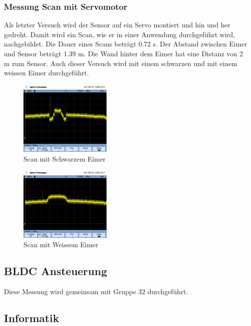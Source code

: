 \subsubsection{Messung Scan mit Servomotor}
Als letzter Versuch wird der Sensor auf ein Servo montiert und hin und her 
gedreht. Damit wird ein Scan, wie er in einer Anwendung durchgeführt wird, 
nachgebildet. Die Dauer eines Scans beträgt 0.72 s. Der Abstand zwischen 
Eimer und Sensor beträgt 1.39 m. Die Wand hinter dem Eimer hat eine Distanz 
von 2 m zum Sensor. Auch dieser Versuch wird mit einem schwarzen und mit einem 
weissen Eimer durchgeführt. 
\begin{figure}[h!]
    \centering
    \includegraphics[width=0.4\textwidth]{fig/scope_80.png}
    \caption{Scan mit Schwarzem Eimer}
    \label{fig:scan_ir_black}
\end{figure}
\begin{figure}[h!]
    \centering
    \includegraphics[width=0.4\textwidth]{fig/scope_82.png}
    \caption{Scan mit Weissem Eimer}
    \label{fig:scan_ir_white}
\end{figure}

\clearpage

\subsection{BLDC Ansteuerung}
Diese Messung wird gemeinsam mit Gruppe 32 durchgeführt. \\

\subsection{Informatik}

